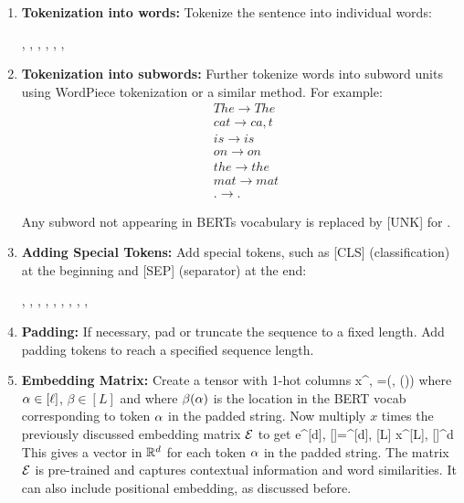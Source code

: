 \begin{enumerate}

  \item \textbf{Tokenization into words:}
       Tokenize the sentence into individual words:

       , , , , , , 

  \item \textbf{Tokenization into subwords:}
     Further tokenize words into subword units using WordPiece tokenization or a similar method. For example:
         \begin{align*}
           &The \rightarrow The \\
           &cat \rightarrow ca, t \\
           &is \rightarrow is \\
           &on \rightarrow on \\
           &the \rightarrow the \\
           &mat \rightarrow mat \\
           &. \rightarrow .
         \end{align*}

         Any subword not appearing in BERTs vocabulary is replaced by [UNK] for
          .

  \item \textbf{Adding Special Tokens:}
     Add special tokens, such as [CLS] (classification) at the beginning and [SEP] (separator) at the end:

      \qt{[CLS]}, , , , , , , , , \qt{[SEP]}

  \item \textbf{Padding:}
     If necessary, pad or truncate the sequence to a fixed length. Add  padding tokens \qt{[PAD]} to reach a specified sequence length.

  \item \textbf{Embedding Matrix:}
     Create a
       tensor with 1-hot columns
       \beq x^{\beta, \alp}
       =\delta(\beta, \beta(\alp))
       \eeq
       where $\alpha\in[\ell]$, $\beta\in[L]$ and where $\beta(\alpha)$
       is the location in the
              BERT vocab
       corresponding to token $\alpha$ in the
       padded string.
       Now multiply $x$ times the previously discussed embedding matrix ${\cal E}$ to get \beq
       e^{[d], [\ell]}=\cale^{[d], [L]}
       x^{[L], [\ell]}\in\RR^{d\times \ell}\eeq
       This gives a vector in ${ \mathbb{R}}^d$
       for each token $\alpha$ in the
       padded string.
        The matrix ${\cal E}$
        is pre-trained and captures contextual information
        and word similarities. It can also
        include positional embedding, as discussed before.
\end{enumerate}

